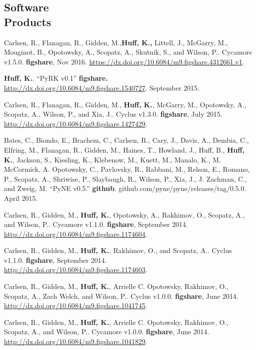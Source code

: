 \documentclass[margin,line]{resume}
\begin{document}
\begin{resume}
    \section{\mysidestyle Software\\Products}
    \begin{bibenum}
    \item Carlsen, R., Flanagan, R., Gidden, M.,\textbf{Huff, K.,} Littell, J., 
            McGarry, M., Mouginot, B., Opotowsky, A., Scopatz, A., Skutnik, S., 
            and Wilson, P.. Cycamore v1.5.0. \textbf{figshare}, Nov 2016. 
            \url{https://dx.doi.org/10.6084/m9.figshare.4312661.v1}.
    \item \textbf{Huff, K.}. ``PyRK v0.1'' \textbf{figshare.} 
            \url{http://dx.doi.org/10.6084/m9.figshare.1540727}. September 2015.
    \item Carlsen, R., Flanagan, R., Gidden, M., \textbf{Huff, K.}, McGarry, 
            M., Opotowsky, A., Scopatz, A., Wilson, P., and Xia, J.. Cyclus 
            v1.3.0. \textbf{figshare}, July 2015. 
            \url{http://dx.doi.org/10.6084/m9.figshare.1427429}.
      \item Bates, C., Biondo, E., Brachem, C., Carlsen, R., Cary, J., Davis, A., Dembia, C., Elfring, M., Flanagan, R., Gidden, M., Haines, T., Howland, J., Huff, B., \textbf{Huff, K.}, Jackson, S., Kiesling, K., Klebenow, M., Kuett, M., Manalo, K., M. McCormick, A. Opotowsky, C., Pavlovsky, R., Rabbani, M., Relson, E., Romano, P., Scopatz, A., Shriwise, P., Slaybaugh, R., Wilson, P., Xia, J., J. Zachman, C., and Zweig, M. ``PyNE v0.5.'' \textbf{github}.  github.com/pyne/pyne/releases/tag/0.5.0. April 2015. 
      \item Carlsen, R., Gidden, M., \textbf{Huff, K.}, Opotowsky, A., 
      Rakhimov, O., Scopatz, A., and Wilson, P.. Cycamore v1.1.0. 
      \textbf{figshare}, September 2014. 
            \url{http://dx.doi.org/10.6084/m9.figshare.1174604}.
      \item Carlsen, R., Gidden, M., \textbf{Huff, K.}, Rakhimov, O., and 
              Scopatz, A.. Cyclus v1.1.0. \textbf{figshare}, September 2014. 
              \url{http://dx.doi.org/10.6084/m9.figshare.1174603}.
      \item Carlsen, R., Gidden, M., \textbf{Huff, K.}, Arrielle C. Opotowsky, 
              Rakhimov, O., Scopatz, A., Zach Welch, and Wilson, P.. Cyclus 
              v1.0.0. \textbf{figshare}, June 2014. 
              \url{http://dx.doi.org/10.6084/m9.figshare.1041745}.
      \item Carlsen, R., Gidden, M., \textbf{Huff, K.}, Arrielle C. Opotowsky, 
              Rakhimov, O., Scopatz, A., and Wilson, P.. Cycamore v1.0.0. 
              \textbf{figshare}, June 2014. 
              \url{http://dx.doi.org/10.6084/m9.figshare.1041829}.
    \end{bibenum}

\end{resume}
\end{document}
